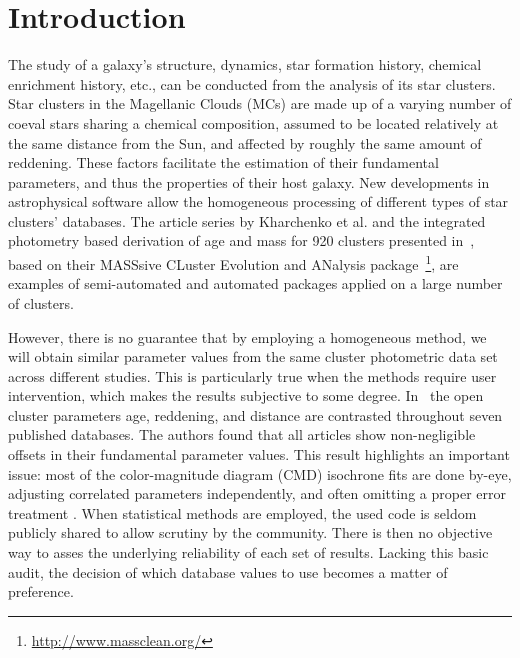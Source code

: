 \documentclass{aa}
\begin{document}
\maketitle
%

\section{Introduction}
\label{sec:intro}

The study of a galaxy's structure, dynamics, star formation history, chemical
enrichment history, etc., can be conducted from the analysis of its star
clusters.
Star clusters in the Magellanic Clouds (MCs) are made up of a varying number of
coeval stars sharing a chemical composition, assumed to be located
relatively at the same distance from the Sun, and affected by roughly the same
amount of reddening. These factors facilitate the estimation of
their fundamental parameters, and thus the properties of their host galaxy.
%
New developments in astrophysical software allow the homogeneous
processing of different types of star clusters' databases. The article series
by Kharchenko et al. 
\citep[see][and references therein]{Kharchenko_2005,Schmeja_2014}
and the integrated photometry based derivation of age and mass for 920 clusters
presented
in~\cite{Popescu_2012}, based on their MASSsive CLuster Evolution and
ANalysis package~\citep[MASSCLEAN,][]{Popescu_2009}\footnote{
\url{http://www.massclean.org/}}, are examples of semi-automated and automated
packages applied on a large number of clusters.

However, there is no guarantee that by employing a homogeneous method, we will
obtain similar parameter values from the same cluster photometric
data set across different studies. This is particularly true when the methods
require user intervention, which makes the results subjective to some degree.
%
In~\cite{Netopil_2015} the open cluster parameters age, reddening, and distance
are contrasted throughout seven published databases. The authors found that all
articles show non-negligible offsets in their fundamental parameter values.
%
This result highlights an important issue: most of the color-magnitude diagram 
(CMD) isochrone fits are done by-eye, adjusting correlated parameters
independently, and often omitting a proper error treatment \citep[see]
[for a more detailed description of this problem]{vonHippel_2014}.
%
When statistical methods are employed, the used code is seldom publicly
shared to allow scrutiny by the community. There is then no objective way to
asses the underlying reliability of each set of results.
Lacking this basic audit, the decision of which database values to use
becomes a matter of preference.
\end{document}
